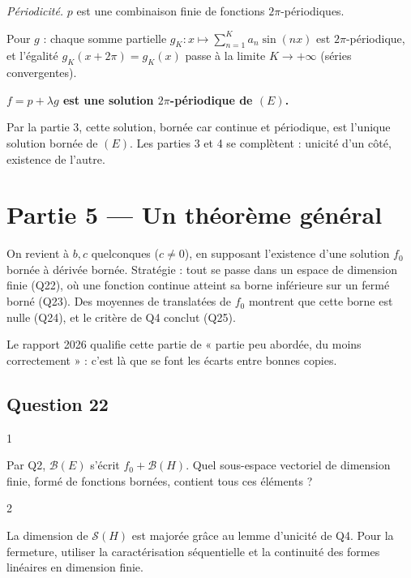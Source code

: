 \documentclass[11pt,a4paper]{article}
\begin{document}
\emph{Périodicité.} \(p\) est une combinaison finie de fonctions \(2\pi\)-périodiques.

Pour \(g\) : chaque somme partielle \(g_K:x\mapsto\sum_{n=1}^{K}a_n\sin(nx)\) est \(2\pi\)-périodique, et l'égalité \(g_K(x+2\pi)=g_K(x)\) passe à la limite \(K\to+\infty\) (séries convergentes).

\textbf{\(f=p+\lambda g\) est une solution \(2\pi\)-périodique de \((E)\).}

\begin{methode}

Par la partie 3, cette solution, bornée car continue et périodique, est l'unique solution bornée de \((E)\). Les parties 3 et 4 se complètent : unicité d'un côté, existence de l'autre.

\end{methode}

\hypertarget{partie-5-un-thuxe9oruxe8me-guxe9nuxe9ral}{%
\section{Partie 5 --- Un théorème général}\label{partie-5-un-thuxe9oruxe8me-guxe9nuxe9ral}}

On revient à \(b,c\) quelconques (\(c\neq0\)), en supposant l'existence d'une solution \(f_0\) bornée à dérivée bornée. Stratégie : tout se passe dans un espace de dimension finie (Q22), où une fonction continue atteint sa borne inférieure sur un fermé borné (Q23). Des moyennes de translatées de \(f_0\) montrent que cette borne est nulle (Q24), et le critère de Q4 conclut (Q25).

Le rapport 2026 qualifie cette partie de « partie peu abordée, du moins correctement » : c'est là que se font les écarts entre bonnes copies.

\hypertarget{question-22}{%
\subsection{Question 22}\label{question-22}}

\begin{indication}{1}

Par Q2, \(\mathcal B(E)\) s'écrit \(f_0+\mathcal B(H)\). Quel sous-espace vectoriel de dimension finie, formé de fonctions bornées, contient tous ces éléments ?

\end{indication}

\begin{indication}{2}

La dimension de \(\mathcal S(H)\) est majorée grâce au lemme d'unicité de Q4. Pour la fermeture, utiliser la caractérisation séquentielle et la continuité des formes linéaires en dimension finie.

\end{indication}
\end{document}
